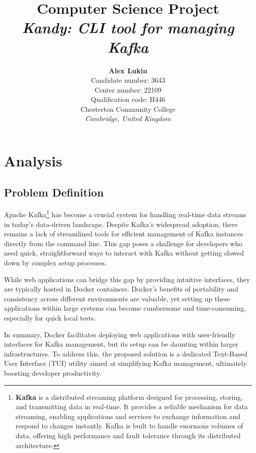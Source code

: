 \documentclass[10pt , a4paper]{report}
\begin{document}
\title{Computer Science Project\\
        \textit{Kandy: CLI tool for managing Kafka}}

\author{\textbf{Alex Lukin}\\
Candidate number: 3643\\
Center number: 22109\\
Qualification code: H446 \\
Chesterton Community College\\
\textit{Cambridge, United Kingdom}\\}


\maketitle

\newpage
\tableofcontents
\newpage

\chapter{Analysis}
\section{Problem Definition}

Apache Kafka\footnote{\textbf{Kafka} is a distributed streaming platform designed for processing, storing, and transmitting data in real-time. It provides a reliable mechanism for data streaming, enabling applications and services to exchange information and respond to changes instantly. Kafka is built to handle enormous volumes of data, offering high performance and fault tolerance through its distributed architecture.} has become a crucial system for handling real-time data streams in today’s data-driven landscape. Despite Kafka’s widespread adoption, there remains a lack of streamlined tools for efficient management of Kafka instances directly from the command line. This gap poses a challenge for developers who need quick, straightforward ways to interact with Kafka without getting slowed down by complex setup processes.

While web applications can bridge this gap by providing intuitive interfaces, they are typically hosted in Docker containers. Docker’s benefits of portability and consistency across different environments are valuable, yet setting up these applications within large systems can become cumbersome and time-consuming, especially for quick local tests.

In summary, Docker facilitates deploying web applications with user-friendly interfaces for Kafka management, but its setup can be daunting within larger infrastructures. To address this, the proposed solution is a dedicated Text-Based User Interface (TUI) utility aimed at simplifying Kafka management, ultimately boosting developer productivity.
\end{document}
